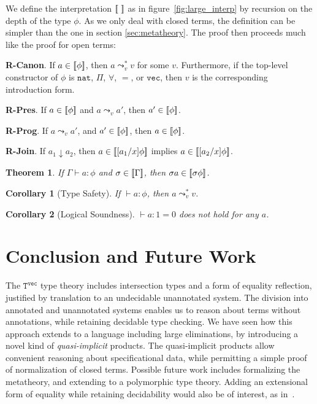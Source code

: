 \documentclass[copyright]{eptcs}
\newtheorem{theorem}{Theorem}
\newtheorem{corollary}{Corollary}
\newcommand{\vc}[0]{\texttt{vec}}
\newcommand{\nat}[0]{\texttt{nat}}
\newcommand{\Tvec}[0]{\texttt{T}^\vc}
\newcommand{\leadstov}[0]{\leadsto_v}
\newcommand{\interp}[1]{[\negthinspace[#1]\negthinspace]}
\begin{document}
We define the interpretation $\interp{\ }$ as in
figure~\ref{fig:large_interp} by recursion on the depth of the
type $\phi$. As we only deal with closed terms, the definition
can be simpler than the one in section \ref{sec:metatheory}.
The proof then proceeds much like the proof for open
terms:

\noindent \textbf{R-Canon}. If $a\in\interp{\phi}$, then $a\leadstov^*
v$ for some $v$. Furthermore, if the top-level constructor of $\phi$
is $\nat$, $\Pi$, $\forall$, $=$, or $\vc$, then $v$ is the
corresponding introduction form.

\noindent \textbf{R-Pres}. If $a\in\interp{\phi}$ and $a \leadstov a'$, then $a' \in \interp{\phi}$.

\noindent \textbf{R-Prog}. If $a \leadstov a'$, and $a' \in \interp{\phi}$, then $a\in\interp{\phi}$.

\noindent \textbf{R-Join}. If $a_1 \downarrow a_2$, then $a \in \interp{[a_1/x]\phi}$ 
implies $a \in \interp{[a_2/x]\phi}$.


\begin{theorem}
\label{thm:fundamental_tveclarge}
If $\Gamma \vdash a : \phi$ and $\sigma \in \interp{\Gamma}$,
then $\sigma a \in \interp{\sigma\phi}$.
\end{theorem}

\begin{corollary}[Type Safety]
\label{cor:sn}
If $\vdash a : \phi$, then $a \leadstov^* v$.
\end{corollary}

\begin{corollary}[Logical Soundness]
$\vdash a:1\!\!=\!0$ does not hold for any $a$.
\end{corollary}


\section{Conclusion and Future Work}

The $\Tvec$ type theory includes intersection types and a form of
equality reflection, justified by translation to an undecidable
unannotated system.  The division into annotated and unannotated
systems enables us to reason about terms without annotations, while
retaining decidable type checking.  We have seen how this approach
extends to a language including large eliminations, by introducing a
novel kind of \emph{quasi-implicit} products. The quasi-implicit
products allow convenient reasoning about specificational data, while
permitting a simple proof of normalization of closed terms.  Possible
future work includes formalizing the metatheory, and extending to a
polymorphic type theory.  Adding an extensional form of equality while
retaining decidability would also be of interest, as
in~\cite{altenkirch+07}.
\end{document}
